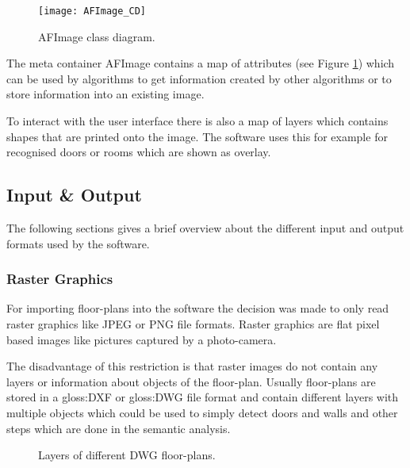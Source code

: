 \begin{figure}[h]
  \centering
      \texttt{[image: AFImage\_CD]}
  \caption{AFImage class diagram.}
  \label{fig:AFImage_CD}
\end{figure}

The meta container AFImage contains a map of attributes (see Figure \ref{fig:AFImage_CD}) which can be used by algorithms to get information created by other algorithms or to store information into an existing image.

To interact with the user interface there is also a map of layers which contains shapes that are printed onto the image. The software uses this for example for recognised doors or rooms which are shown as overlay.

\pagebreak

\subsection{Input \& Output}
The following sections gives a brief overview about the different input and output formats used by the software.

\subsubsection{Raster Graphics}
For importing floor-plans into the software the decision was made to only read raster graphics like JPEG or PNG file formats. Raster graphics are flat pixel based images like pictures captured by a photo-camera.

The disadvantage of this restriction is that raster images do not contain any layers or information about objects of the floor-plan. Usually floor-plans are stored in a \gls{gloss:DXF} or \gls{gloss:DWG} file format and contain different layers with multiple objects which could be used to simply detect doors and walls and other steps which are done in the semantic analysis.

\begin{figure}[h]
	\centering
	\hfill
	\hfill
	\caption{Layers of different DWG floor-plans. }
	\label{fig:layer_comparison}
\end{figure}

